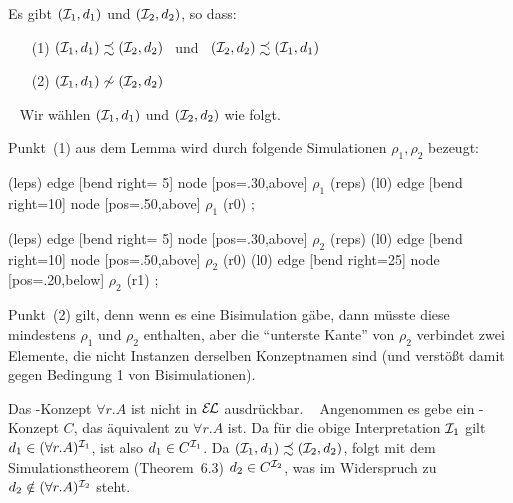\documentclass[fontsize=11pt, twoside=false, numbers=autoenddot]{scrbook}
\begin{document}
Es gibt $(\mathcal{I}_1,d_1)$ und $(\mathcal{I}_2,d_2)$, so dass:
%
\begin{enumerate}
  \item[(1)]
    $(\mathcal{I}_1,d_1) \precsim (\mathcal{I}_2,d_2)$ ~und~ $(\mathcal{I}_2,d_2) \precsim (\mathcal{I}_1,d_1)$
  \item[(2)]
    $(\mathcal{I}_1,d_1) \not\sim (\mathcal{I}_2,d_2)$
\end{enumerate}
%
\parII
{}~
Wir wählen $(\mathcal{I}_1,d_1)$ und $(\mathcal{I}_2,d_2)$ wie folgt.
%
\begin{center}
  \begin{tikzpicturetwointerp}
  \end{tikzpicturetwointerp}    
\end{center}
%
Punkt~(1) aus dem Lemma wird durch folgende Simulationen $\rho_1,\rho_2$ bezeugt:
\begin{center}
    \begin{tikzpicturetwointerp}
        (leps) edge [bend right= 5] node [pos=.30,above] {$\rho_1$} (reps)
        (l0)   edge [bend right=10] node [pos=.50,above] {$\rho_1$} (r0)
      ;
    \end{tikzpicturetwointerp}
    \hspace*{20mm}
    \begin{tikzpicturetwointerp}
        (leps) edge [bend right= 5] node [pos=.30,above] {$\rho_2$} (reps)
        (l0)   edge [bend right=10] node [pos=.50,above] {$\rho_2$} (r0)
        (l0)   edge [bend right=25] node [pos=.20,below] {$\rho_2$} (r1)
      ;
    \end{tikzpicturetwointerp}
\end{center}
%
Punkt~(2) gilt, denn wenn es eine Bisimulation gäbe,
dann müsste diese mindestens $\rho_1$ und $\rho_2$ enthalten,
aber die "`unterste Kante"' von $\rho_2$ verbindet zwei Elemente,
die nicht Instanzen derselben Konzeptnamen sind
(und verstößt damit gegen Bedingung 1 von Bisimulationen).
\qedhere

\goodbreak
\parIII
{}
Das \ALC-Konzept $\forall r.A$ ist nicht in $\mathcal{E\!\!\:L}$ ausdrückbar.
%
\parII
{}~
Angenommen es gebe ein \EL-Konzept $C$, das äquivalent zu $\forall r.A$ ist.
Da für die obige Interpretation $\mathcal{I}_1$ gilt $d_1 \in (\forall r.A)^{\mathcal{I}_1}$,
ist also $d_1 \in C^{\mathcal{I}_1}$.
Da $(\mathcal{I}_1,d_1) \precsim (\mathcal{I}_2,d_2)$, folgt mit dem Simulationstheorem
(Theorem~6.3) $d_2 \in C^{\mathcal{I}_2}$,
was im Widerspruch zu $d_2 \notin (\forall r.A)^{\mathcal{I}_2}$ steht.
\qedhere
\end{document}
